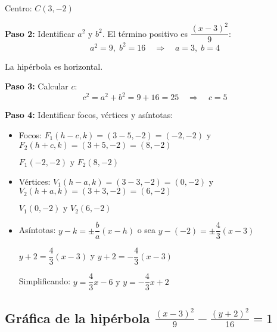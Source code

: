 \documentclass[12pt,a4paper]{article}
\begin{document}
	Centro: $\boxed{C(3,-2)}$

	\textbf{Paso 2:} Identificar $a^2$ y $b^2$. El término positivo es $\dfrac{(x-3)^2}{9}$:
	\[
	a^2=9,\;b^2=16 \quad\Rightarrow\quad a=3,\;b=4
	\]

	La hipérbola es horizontal.

	\textbf{Paso 3:} Calcular $c$:
	\[
	c^2=a^2+b^2=9+16=25 \quad\Rightarrow\quad c=5
	\]

	\textbf{Paso 4:} Identificar focos, vértices y asíntotas:
	\begin{itemize}
		\item Focos: $F_1(h-c,k)=(3-5,-2)=(-2,-2)$ y $F_2(h+c,k)=(3+5,-2)=(8,-2)$

		$\boxed{F_1(-2,-2)\text{ y }F_2(8,-2)}$

		\item Vértices: $V_1(h-a,k)=(3-3,-2)=(0,-2)$ y $V_2(h+a,k)=(3+3,-2)=(6,-2)$

		$\boxed{V_1(0,-2)\text{ y }V_2(6,-2)}$

		\item Asíntotas: $y-k=\pm\dfrac{b}{a}(x-h)$ o sea $y-(-2)=\pm\dfrac{4}{3}(x-3)$

		$y+2=\dfrac{4}{3}(x-3)$ y $y+2=-\dfrac{4}{3}(x-3)$

		Simplificando: $\boxed{y=\dfrac{4}{3}x-6\text{ y }y=-\dfrac{4}{3}x+2}$
	\end{itemize}

	\subsection*{Gráfica de la hipérbola $\displaystyle\frac{(x-3)^2}{9}-\frac{(y+2)^2}{16}=1$}
\end{document}
